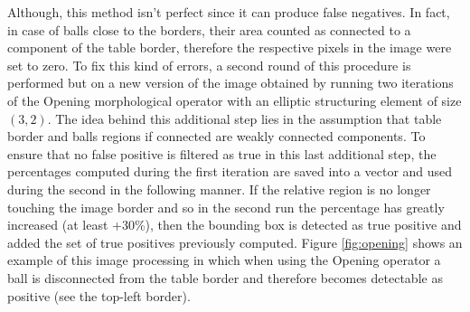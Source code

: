Although, this method isn't perfect since it can produce false negatives. In fact, in case of balls close to the borders, their area counted as connected to a component 
of the table border, therefore the respective pixels in the image were set to zero. To fix this kind of errors, a second round of this
procedure is performed but on a new version of the image obtained by running two iterations of the Opening morphological operator with an elliptic 
structuring element of size $(3,2)$. The idea behind this additional step lies in the assumption that table border and balls regions if connected
are weakly connected components. To ensure that no false positive is filtered as true in this last additional step, the percentages
computed during the first iteration are saved into a vector and used during the second in the following manner. If the relative region is no longer touching the image border
and so in the second run the percentage has greatly increased (at least +30\%), then the bounding box is detected as true positive and added
the set of true positives previously computed. Figure \ref{fig:opening} shows an example of this image processing in which when using the Opening operator a ball is disconnected
from the table border and therefore becomes detectable as positive (see the top-left border).\\
